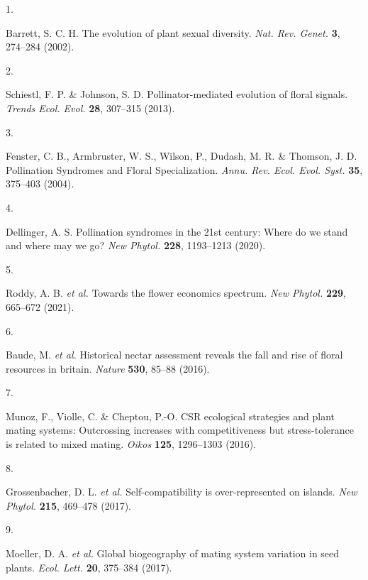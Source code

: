 \documentclass[
  12pt,
  a4paper,
]{article}
\newlength{\cslhangindent}
\newlength{\csllabelwidth}
\newlength{\cslentryspacingunit} %
\newenvironment{CSLReferences}[2] %
 {%
  \setlength{\parindent}{0pt}
  \ifodd #1
  \let\oldpar\par
  \def\par{\hangindent=\cslhangindent\oldpar}
  \fi
  \setlength{\parskip}{#2\cslentryspacingunit}
 }%
 {}
\newcommand{\CSLLeftMargin}[1]{\parbox[t]{\csllabelwidth}{#1}}
\newcommand{\CSLRightInline}[1]{\parbox[t]{\linewidth - \csllabelwidth}{#1}\break}
\begin{document}
\hypertarget{refs}{}
\begin{CSLReferences}{0}{0}
\leavevmode{}%
\CSLLeftMargin{1. }
\CSLRightInline{Barrett, S. C. H. The evolution of plant sexual diversity. \emph{Nat. Rev. Genet.} \textbf{3}, 274--284 (2002).}

\leavevmode{}%
\CSLLeftMargin{2. }
\CSLRightInline{Schiestl, F. P. \& Johnson, S. D. Pollinator-mediated evolution of floral signals. \emph{Trends Ecol. Evol.} \textbf{28}, 307--315 (2013).}

\leavevmode{}%
\CSLLeftMargin{3. }
\CSLRightInline{Fenster, C. B., Armbruster, W. S., Wilson, P., Dudash, M. R. \& Thomson, J. D. Pollination {Syndromes} and {Floral Specialization}. \emph{Annu. Rev. Ecol. Evol. Syst.} \textbf{35}, 375--403 (2004).}

\leavevmode{}%
\CSLLeftMargin{4. }
\CSLRightInline{Dellinger, A. S. Pollination syndromes in the 21st century: Where do we stand and where may we go? \emph{New Phytol.} \textbf{228}, 1193--1213 (2020).}

\leavevmode{}%
\CSLLeftMargin{5. }
\CSLRightInline{Roddy, A. B. \emph{et al.} Towards the flower economics spectrum. \emph{New Phytol.} \textbf{229}, 665--672 (2021).}

\leavevmode{}%
\CSLLeftMargin{6. }
\CSLRightInline{Baude, M. \emph{et al.} Historical nectar assessment reveals the fall and rise of floral resources in britain. \emph{Nature} \textbf{530}, 85--88 (2016).}

\leavevmode{}%
\CSLLeftMargin{7. }
\CSLRightInline{Munoz, F., Violle, C. \& Cheptou, P.-O. {CSR} ecological strategies and plant mating systems: Outcrossing increases with competitiveness but stress-tolerance is related to mixed mating. \emph{Oikos} \textbf{125}, 1296--1303 (2016).}

\leavevmode{}%
\CSLLeftMargin{8. }
\CSLRightInline{Grossenbacher, D. L. \emph{et al.} Self-compatibility is over-represented on islands. \emph{New Phytol.} \textbf{215}, 469--478 (2017).}

\leavevmode{}%
\CSLLeftMargin{9. }
\CSLRightInline{Moeller, D. A. \emph{et al.} Global biogeography of mating system variation in seed plants. \emph{Ecol. Lett.} \textbf{20}, 375--384 (2017).}


\end{CSLReferences}
\end{document}
